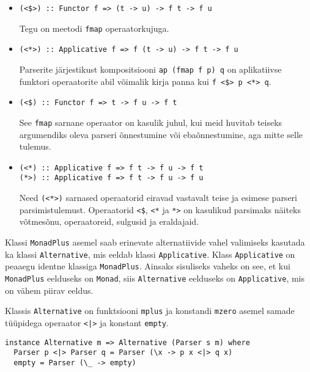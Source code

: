 \documentclass[12pt]{article}
\begin{document}
        \begin{itemize}
          \item
            \begin{verbatim}(<$>) :: Functor f => (t -> u) -> f t -> f u\end{verbatim}

            Tegu on meetodi \verb!fmap! operaatorkujuga.
          \item
            \begin{verbatim}(<*>) :: Applicative f => f (t -> u) -> f t -> f u\end{verbatim}

            Parserite järjestikust kompositsiooni \verb!ap (fmap f p) q! on aplikatiivse funktori operaatorite abil võimalik kirja panna kui \verb!f <$> p <*> q!.
          \item
            \begin{verbatim}(<$) :: Functor f => t -> f u -> f t\end{verbatim}

            See \verb!fmap! sarnane operaator on kasulik juhul, kui meid huvitab teiseks argumendiks oleva parseri õnnestumine või ebaõnnestumine, aga mitte selle tulemus.
          \item
            \begin{verbatim}(<*) :: Applicative f => f t -> f u -> f t
(*>) :: Applicative f => f t -> f u -> f u\end{verbatim}

            Need \verb!(<*>)! sarnased operaatorid eiravad vastavalt teise ja esimese parseri parsimistulemust. Operaatorid \verb!<$!, \verb!<*! ja \verb!*>! on kasulikud parsimaks näiteks võtmesõnu, operaatoreid, sulgusid ja eraldajaid.
        \end{itemize}

        Klassi \verb!MonadPlus! asemel saab erinevate alternatiivide vahel valimiseks kasutada ka klassi \verb!Alternative!, mis eeldab klassi \verb!Applicative!. Klass \verb!Applicative! on peaaegu identne klassiga \verb!MonadPlus!. Ainsaks sisuliseks vaheks on see, et kui \verb!MonadPlus! eelduseks on \verb!Monad!, siis \verb!Alternative! eelduseks on \verb!Applicative!, mis on vähem piirav eeldus.

        Klassis \verb!Alternative! on funktsiooni \verb!mplus! ja konstandi \verb!mzero! asemel samade tüüpidega operaator \verb!<|>! ja konstant \verb!empty!.

        \begin{verbatim}instance Alternative m => Alternative (Parser s m) where
  Parser p <|> Parser q = Parser (\x -> p x <|> q x)
  empty = Parser (\_ -> empty)\end{verbatim}
\end{document}
